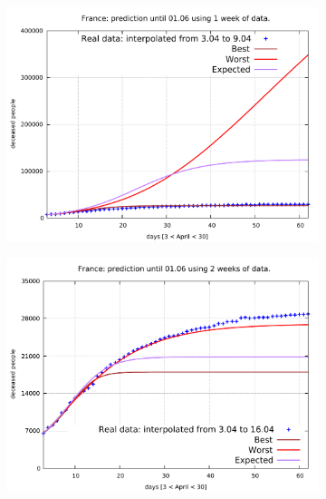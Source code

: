 \documentclass[8pt]{article}
\begin{document}
\begin{figure}[h!]
  \centering
  \begin{subfigure}[b]{0.45\linewidth}
  \includegraphics[width=\linewidth]{../err100p_simulations/fr/3-9/3-9.pdf}
  \end{subfigure}
  \begin{subfigure}[b]{0.45\linewidth}
    \includegraphics[width=\linewidth]{../err100p_simulations/fr/3-16/3-16.pdf}
  \end{subfigure}
  \begin{subfigure}[b]{0.45\linewidth}

\end{subfigure}
\end{figure}
\end{document}
